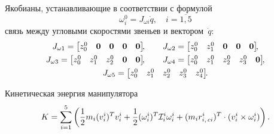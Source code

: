 Якобианы, устанавливающие в соответствии с формулой
\begin{equation}\label{eq_work_of_ang_jacobians}
    \omega^0_{i} = J_{\omega i}\dot{q}, \quad i = \overline{1,5}
\end{equation}
связь между угловыми скоростями звеньев и вектором~$\dot{q}$:
\begin{gather}
    J_{\omega 1} =
    \begin{bmatrix}
        z^0_0 & \nv & \nv & \nv & \nv
    \end{bmatrix}\!\!,
    \qquad
    J_{\omega 2} =
    \begin{bmatrix}
        z^0_0 & z^0_1 & \nv & \nv & \nv
    \end{bmatrix}\!\!,
    \\
    J_{\omega 3} =
    \begin{bmatrix}
         z^0_0 & z^0_1 & z^0_2 & \nv & \nv
    \end{bmatrix}\!\!,
    \qquad
    J_{\omega 4} =
    \begin{bmatrix}
        z^0_0 & z^0_1 & z^0_2 & z^0_3 & \nv
    \end{bmatrix}\!\!,
    \\
    J_{\omega 5} =
    \begin{bmatrix}
        z^0_0 & z^0_1 & z^0_2 & z^0_3 & z^0_4
    \end{bmatrix}\!\!\ldotp
\end{gather}

Кинетическая энергия манипулятора
\begin{equation}\label{eq_eq_for_K_for_linear_model}
    K = \sum_{i=1}^5 \left( \frac{1}{2} m_i (v^i_i)^T v^i_i + \frac{1}{2} (\omega^i_i)^T \mathcal{I}^{i}_i \omega^i_i + (m_ir^i_{i,\,ci})^T \cdot (v^i_i \times \omega^i_i) \right)  \ldotp
\end{equation}

